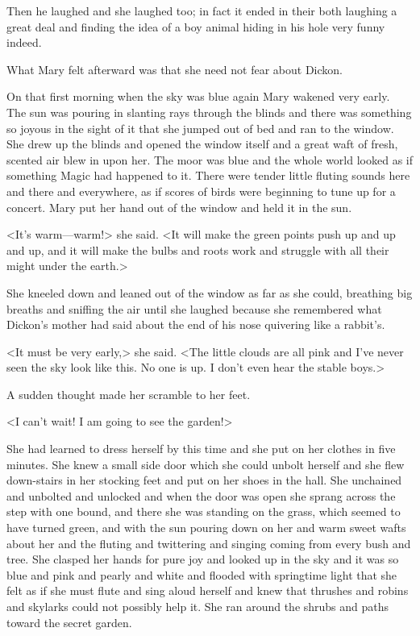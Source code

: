 Then he laughed and she laughed too; in fact it ended in their both laughing a great deal and finding the idea of a boy animal hiding in his hole very funny indeed.

What Mary felt afterward was that she need not fear about Dickon.

On that first morning when the sky was blue again Mary wakened very early. The sun was pouring in slanting rays through the blinds and there was something so joyous in the sight of it that she jumped out of bed and ran to the window. She drew up the blinds and opened the window itself and a great waft of fresh, scented air blew in upon her. The moor was blue and the whole world looked as if something Magic had happened to it. There were tender little fluting sounds here and there and everywhere, as if scores of birds were beginning to tune up for a concert. Mary put her hand out of the window and held it in the sun.

<It's warm—warm!> she said. <It will make the green points push up and up and up, and it will make the bulbs and roots work and struggle with all their might under the earth.>

She kneeled down and leaned out of the window as far as she could, breathing big breaths and sniffing the air until she laughed because she remembered what Dickon's mother had said about the end of his nose quivering like a rabbit's.

<It must be very early,> she said. <The little clouds are all pink and I've never seen the sky look like this. No one is up. I don't even hear the stable boys.>

A sudden thought made her scramble to her feet.

<I can't wait! I am going to see the garden!>

She had learned to dress herself by this time and she put on her clothes in five minutes. She knew a small side door which she could unbolt herself and she flew down-stairs in her stocking feet and put on her shoes in the hall. She unchained and unbolted and unlocked and when the door was open she sprang across the step with one bound, and there she was standing on the grass, which seemed to have turned green, and with the sun pouring down on her and warm sweet wafts about her and the fluting and twittering and singing coming from every bush and tree. She clasped her hands for pure joy and looked up in the sky and it was so blue and pink and pearly and white and flooded with springtime light that she felt as if she must flute and sing aloud herself and knew that thrushes and robins and skylarks could not possibly help it. She ran around the shrubs and paths toward the secret garden.

